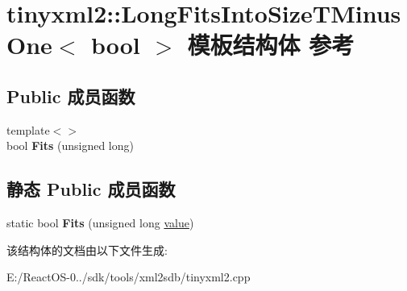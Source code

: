 \hypertarget{structtinyxml2_1_1_long_fits_into_size_t_minus_one}{}\section{tinyxml2\+:\+:Long\+Fits\+Into\+Size\+T\+Minus\+One$<$ bool $>$ 模板结构体 参考}
\label{structtinyxml2_1_1_long_fits_into_size_t_minus_one}
\subsection*{Public 成员函数}
\begin{DoxyCompactItemize}
\item 
\mbox{\label{structtinyxml2_1_1_long_fits_into_size_t_minus_one_a85fb9734fefa25d130ea831f683fc444}} 
{\footnotesize template$<$$>$ }\\bool {\bfseries Fits} (unsigned long)
\end{DoxyCompactItemize}
\subsection*{静态 Public 成员函数}
\begin{DoxyCompactItemize}
\item 
\mbox{\label{structtinyxml2_1_1_long_fits_into_size_t_minus_one_a3057710104ab733963eb32fda0bc374c}} 
static bool {\bfseries Fits} (unsigned long \hyperlink{unionvalue}{value})
\end{DoxyCompactItemize}


该结构体的文档由以下文件生成\+:\begin{DoxyCompactItemize}
\item 
E\+:/\+React\+O\+S-\/0../sdk/tools/xml2sdb/tinyxml2.\+cpp\end{DoxyCompactItemize}
